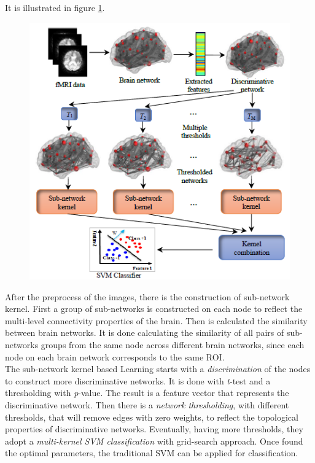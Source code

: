 It is illustrated in figure \ref{fig:diagram15}.

\begin{figure}[htbp]
	\centering
	\includegraphics[scale=0.8]{Immagini/subnetwork1.PNG}
	\caption{\label{fig:diagram15}}
\end{figure}

After the preprocess of the images, there is the construction of sub-network kernel. First a group of sub-networks is constructed on each node to reflect the multi-level connectivity properties of the brain. Then is calculated the similarity between brain networks. It is done calculating the similarity of all pairs of sub-networks groups from the same node across different brain networks, since each node on each brain network corresponds to the same ROI. 
\\

The sub-network kernel based Learning starts with a \textit{discrimination} of the nodes to construct more discriminative networks. It is done with \textit{t}-test and a thresholding with \textit{p}-value. The result is a feature vector that represents the discriminative network. Then there is a \textit{network thresholding}, with different thresholds, that will remove edges with zero weights, to reflect the topological properties of discriminative networks. Eventually, having more thresholds, they adopt a \textit{multi-kernel SVM classification} with grid-search approach. Once found the optimal parameters, the traditional SVM can be applied for classification.
\\

